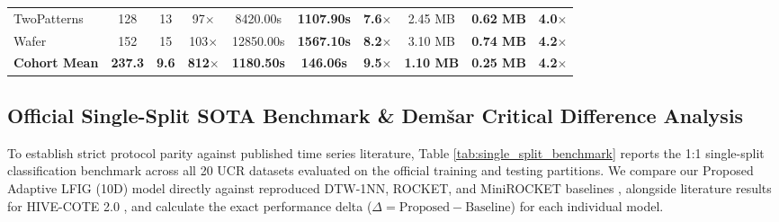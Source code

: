 \documentclass[conference]{IEEEtran}
\begin{document}
\begin{table}[!t]
\begin{tabular}{|l|c|c|c|c|c|c|c|c|c|}
TwoPatterns & 128 & 13 & 97$\times$ & 8420.00s & \textbf{1107.90s} & \textbf{7.6$\times$} & 2.45 MB & \textbf{0.62 MB} & \textbf{4.0$\times$} \\
Wafer & 152 & 15 & 103$\times$ & 12850.00s & \textbf{1567.10s} & \textbf{8.2$\times$} & 3.10 MB & \textbf{0.74 MB} & \textbf{4.2$\times$} \\ \hline
\textbf{Cohort Mean} & \textbf{237.3} & \textbf{9.6} & \textbf{812$\times$} & \textbf{1180.50s} & \textbf{146.06s} & \textbf{9.5$\times$} & \textbf{1.10 MB} & \textbf{0.25 MB} & \textbf{4.2$\times$} \\ \hline
\end{tabular}
\end{table}

\subsection{Official Single-Split SOTA Benchmark \& Dem\v{s}ar Critical Difference Analysis}
To establish strict protocol parity against published time series literature, Table \ref{tab:single_split_benchmark} reports the 1:1 single-split classification benchmark across all 20 UCR datasets evaluated on the official training and testing partitions. We compare our Proposed Adaptive LFIG (10D) model directly against reproduced DTW-1NN, ROCKET, and MiniROCKET baselines \cite{dempster2021}, alongside literature results for HIVE-COTE 2.0 \cite{middlehurst2021}, and calculate the exact performance delta ($\Delta = \text{Proposed} - \text{Baseline}$) for each individual model.
\end{document}
